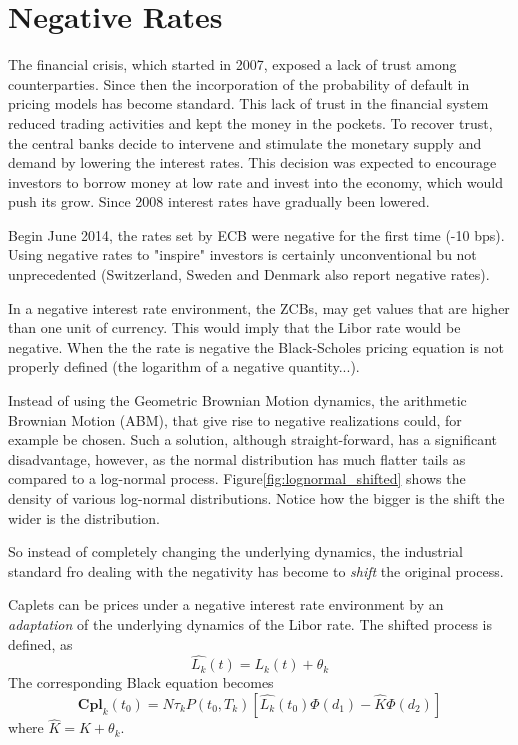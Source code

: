 \documentclass[12pt,a4paper]{book}
\begin{document}
\section{Negative Rates}

The financial crisis, which started in 2007, exposed a lack of trust among counterparties. Since then the incorporation of the probability of default in pricing models has become standard.
This lack of trust in the financial system reduced trading activities and kept the money in the pockets.
To recover trust, the central banks decide to intervene and stimulate the monetary supply and demand by lowering the interest rates.
This decision was expected to encourage investors to borrow money at low rate and invest into the economy, which would push its grow. Since 2008 interest rates have gradually been lowered.

Begin June 2014, the rates set by ECB were negative for the first time (-10 bps). Using negative rates to "inspire" investors is certainly unconventional bu not unprecedented (Switzerland, Sweden and Denmark also report negative rates).

In a negative interest rate environment, the ZCBs, may get values that are higher than one unit of currency. This would imply that the Libor rate would be negative. When the the rate is negative the Black-Scholes pricing equation is not properly defined (the logarithm of a negative quantity...).

Instead of using the Geometric Brownian Motion dynamics, the arithmetic Brownian Motion (ABM), that give rise to negative realizations could, for example be chosen. Such a solution, although straight-forward, has a significant disadvantage, however, as the normal distribution has much flatter tails as compared to a log-normal process. Figure\ref{fig:lognormal_shifted} shows the density of various log-normal  distributions. Notice how the bigger is the shift the wider is the distribution.

So instead of completely changing the underlying dynamics, the industrial standard fro dealing with the negativity has become to \emph{shift} the original process.

Caplets can be prices under a negative interest rate environment by an \emph{adaptation} of the underlying dynamics of the Libor rate. The shifted process is defined, as
\begin{equation}
\hat{L_k}(t) = L_k(t) + \theta_k
\end{equation}
The corresponding Black equation becomes
\begin{equation}
	\textbf{Cpl}_k(t_0) = N\tau_k P(t_0, T_k)\left[\hat{L_k}(t_0)\Phi(d_1)-\hat{K}\Phi(d_2)\right] 
\end{equation}
where $\hat{K} = K + \theta_k$.
\end{document}
